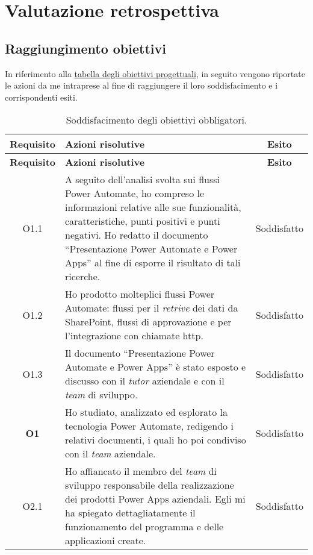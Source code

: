 \chapter{Valutazione retrospettiva}
\label{cap:valutazioneRetrospettiva}
\section{Raggiungimento obiettivi}
In riferimento alla \hyperref[tab:obiettiviProgettuali]{tabella degli obiettivi progettuali}, in seguito vengono riportate le azioni da me intraprese al fine di raggiungere il loro soddisfacimento e i corrispondenti esiti.

\begingroup
\renewcommand\arraystretch{1.3}
\begin{longtable}{|c|p{8cm}|c|}
    \caption{Soddisfacimento degli obiettivi obbligatori.}
    \label{tab:soddObbObbligatori}\\
    \hline \textbf{Requisito} & \textbf{Azioni risolutive} & \textbf{Esito}\\ \endfirsthead
    \hline \textbf{Requisito} & \textbf{Azioni risolutive} & \textbf{Esito}\\ \endhead
    \hline \endfoot
    \hline \endlastfoot
    \hline O1.1  & A seguito dell'analisi svolta sui flussi Power Automate, ho compreso le informazioni relative alle sue funzionalità, caratteristiche, punti positivi e punti negativi. Ho redatto il documento “Presentazione Power Automate e Power Apps” al fine di esporre il risultato di tali ricerche. & Soddisfatto\\
    \hline O1.2  & Ho prodotto molteplici flussi Power Automate: flussi per il \emph{retrive} dei dati da SharePoint, flussi di approvazione e per l'integrazione con chiamate \gls{http}. & Soddisfatto\\
    \hline O1.3  & Il documento “Presentazione Power Automate e Power Apps” è stato esposto e discusso con il \emph{tutor} aziendale e con il \emph{team} di sviluppo. & Soddisfatto\\
    \hline \textbf{O1}    & Ho studiato, analizzato ed esplorato la tecnologia Power Automate, redigendo i relativi documenti, i quali ho poi condiviso con il \emph{team} aziendale. & Soddisfatto\\
    \hline O2.1  & Ho affiancato il membro del \emph{team} di sviluppo responsabile della realizzazione dei prodotti Power Apps aziendali. Egli mi ha spiegato dettagliatamente il funzionamento del programma e delle applicazioni create. & Soddisfatto\\

\end{longtable}
